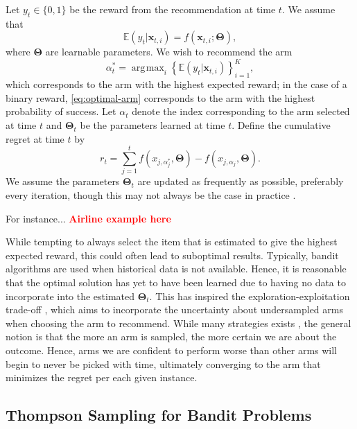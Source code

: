 \documentclass[12pt]{article}
\newcommand{\bred}[1]{\textbf{\textcolor{red}{#1}}}
\DeclareMathOperator*{\argmax}{\arg\!\max}
\begin{document}
Let $y_t \in \{0,1\}$ be the reward from the recommendation at time $t$. 
We assume that 
\begin{equation}
\mathbb{E}(y_t \vert \bm{x}_{t,i}) = f(\bm{x}_{t,i}; \bm{\Theta}),
\end{equation}
where $\bm{\Theta}$ are learnable parameters.
We wish to recommend the arm 
\begin{equation}
\alpha_t^* = \argmax_i \left\{\mathbb{E}(y_t \vert \bm{x}_{t,i})\right\}_{i = 1}^K,
\label{eq:optimal-arm}
\end{equation}
which corresponds to the arm with the highest expected reward; in the case of 
a binary reward, \eqref{eq:optimal-arm} corresponds to the arm with the highest 
probability of success.  
Let $\alpha_t$ denote the index corresponding to the arm selected at time $t$ and 
$\bm{\Theta}_t$ be the parameters learned at time $t$.
Define the cumulative regret at time $t$ by
\begin{equation}
r_t = \sum_{j = 1}^{t} 
f(x_{j, \alpha_j^*}, \bm{\Theta}) 
- f(x_{j, \alpha_j}, \bm{\Theta}).
\label{eq:regret}
\end{equation}
We assume the parameters $\bm{\Theta}_t$ are updated as frequently as 
possible, preferably every iteration, though this may not always be the case in 
practice \cite{joulani2013online}.

For instance... \bred{Airline example here}

While tempting to always select the item that is estimated to give the highest
expected reward, this could often lead to suboptimal results.
Typically, bandit algorithms are used when historical data is not available.  
Hence, it is reasonable that the optimal solution has yet to have been learned due
to having no data to incorporate into the estimated $\bm{\Theta}_t$.
This has inspired the exploration-exploitation trade-off 
\cite{audibert2009exploration}, which aims to incorporate the uncertainty about 
undersampled arms when choosing the arm to recommend.
While many strategies exists 
\cite{chapelle2011empirical} \cite{garivier2011kl} \cite{karnin2013almost}, 
the general notion is that the more an arm is sampled, the more certain we are 
about the outcome. 
Hence, arms we are confident to perform worse than other arms will begin to never 
be picked with time, ultimately converging to the arm that minimizes the regret 
per each given instance.

\subsection{Thompson Sampling for Bandit Problems}
\end{document}
